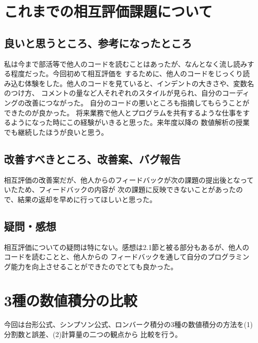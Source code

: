 \documentclass[titlepage]{jsarticle}
\begin{document}
\section{これまでの相互評価課題について}
	\subsection{良いと思うところ、参考になったところ}
		私は今まで部活等で他人のコードを読むことはあったが、なんとなく流し読みする程度だった。今回初めて相互評価を
		するために、他人のコードをじっくり読み込む体験をした。他人のコードを見ていると、インデントの大きさや、変数名のつけ方、	
		コメントの量など人それぞれのスタイルが見られ、自分のコーディングの改善につながった。
		自分のコードの悪いところも指摘してもらうことができたのが良かった。
		将来業務で他人とプログラムを共有するような仕事をするようになった時にこの経験がいきると思った。来年度以降の
		数値解析の授業でも継続したほうが良いと思う。


	\subsection{改善すべきところ、改善案、バグ報告}
		相互評価の改善案だが、他人からのフィードバックが次の課題の提出後となっていたため、フィードバックの内容が
		次の課題に反映できないことがあったので、結果の返却を早めに行ってほしいと思った。

	\subsection{疑問・感想}
		相互評価についての疑問は特にない。感想は2.1節と被る部分もあるが、他人のコードを読むことと、他人からの
		フィードバックを通して自分のプログラミング能力を向上させることができたのでとても良かった。
		

\section{3種の数値積分の比較}
	今回は台形公式、シンプソン公式、ロンバーク積分の3種の数値積分の方法を(1)分割数と誤差、(2)計算量の二つの観点から
	比較を行う。
	
\end{document}
